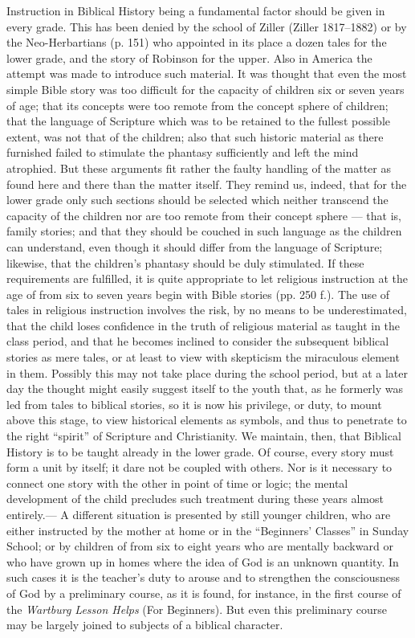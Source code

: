 Instruction in Biblical History being a fundamental factor should be given in every grade. This has been denied by the school of Ziller (Ziller 1817–1882) or by the Neo-Herbartians (p. 151) who appointed in its place a dozen tales for the lower grade, and the story of Robinson for the upper. Also in America the attempt was made to introduce such material. It was thought that even the most simple
Bible story was too difficult for the capacity of children six or seven years of age; that its concepts were too remote from the concept sphere of children; that the language of Scripture which was to be retained to the fullest possible extent, was not that of the children; also that such historic material as there furnished failed to stimulate the phantasy sufficiently and left the mind atrophied. But these arguments fit rather the faulty handling of the matter as found here and there than the matter itself. They remind us, indeed, that for the lower grade only such sections should be selected which neither transcend the capacity of the children nor are too remote from their concept sphere — that is, family stories; and that they should be couched in such language as the children can understand, even though it should differ from the language of Scripture; likewise, that the children’s phantasy should be duly stimulated. If these requirements are fulfilled, it is quite appropriate to let religious instruction at the age of from six to seven years begin with Bible stories (pp. 250 f.). The use of tales in religious instruction involves the risk, by no means to be underestimated, that the child loses confidence in the truth of religious material as taught in the class period, and that he becomes inclined to consider the subsequent biblical stories as mere tales, or at least to view with skepticism the miraculous element in them. Possibly this may not take place during the school period, but at a later day the thought might easily suggest itself to the youth that, as he formerly was led from tales to biblical stories, so it is now his privilege, or duty, to mount above this stage, to view historical elements as symbols, and thus to penetrate to the right “spirit” of Scripture and Christianity. We maintain, then, that Biblical History is to be taught already in the lower grade. Of course, every story must form a unit by itself; it dare not be coupled with others. Nor is it necessary to connect one
story with the other in point of time or logic; the mental development of the child precludes such treatment during these years almost entirely.— A different situation is presented by still younger children, who are either instructed by the mother at home or in the “Beginners’ Classes” in Sunday School; or by children of from six to eight years who are mentally backward or who have grown up in homes where the idea of God is an unknown quantity. In such cases it is the teacher’s duty to arouse and to strengthen the consciousness of God by a preliminary course, as it is found, for instance, in the first course of the \emph{Wartburg Lesson Helps} (For Beginners). But even this preliminary course may be largely joined to subjects of a biblical character.

